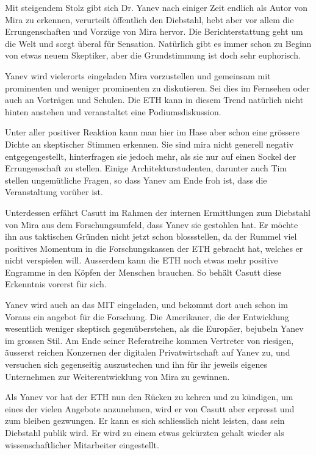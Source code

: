 \documentclass[11pt,a4paper,ngerman]{scrreprt}
\begin{document}
Mit steigendem Stolz gibt sich Dr. Yanev nach einiger Zeit endlich als Autor von
Mira zu erkennen, verurteilt öffentlich den Diebstahl, hebt aber vor allem die
Errungenschaften und Vorzüge von Mira hervor. Die Berichterstattung geht um die
Welt und sorgt überal für Sensation. Natürlich gibt es immer schon zu Beginn von
etwas neuem Skeptiker, aber die Grundstimmung ist doch sehr euphorisch.

Yanev wird vielerorts eingeladen Mira vorzustellen und gemeinsam mit prominenten
und weniger prominenten zu diskutieren. Sei dies im Fernsehen oder auch an
Vorträgen und Schulen. Die ETH kann in diesem Trend natürlich nicht hinten
anstehen und veranstaltet eine Podiumsdiskussion.

Unter aller positiver Reaktion kann man hier im Hase aber schon eine grössere
Dichte an skeptischer Stimmen erkennen. Sie sind mira nicht generell negativ
entgegengestellt, hinterfragen sie jedoch mehr, als sie nur auf einen Sockel der
Errungenschaft zu stellen. Einige Architekturstudenten, darunter auch Tim
stellen ungemütliche Fragen, so dass Yanev am Ende froh ist, dass die
Veranstaltung vorüber ist.

Unterdessen erfährt Casutt im Rahmen der internen Ermittlungen zum Diebstahl
von Mira aus dem Forschungsumfeld, dass Yanev sie gestohlen hat. Er möchte ihn
aus taktischen Gründen nicht jetzt schon blossstellen, da der Rummel viel
positives Momentum in die Forschungskassen der ETH gebracht hat, welches er
nicht verspielen will. Ausserdem kann die ETH noch etwas mehr positive Engramme
in den Köpfen der Menschen brauchen. So behält Casutt diese Erkenntnis vorerst
für sich.

Yanev wird auch an das MIT eingeladen, und bekommt dort auch schon im Voraus ein
angebot für die Forschung. Die Amerikaner, die der Entwicklung wesentlich
weniger skeptisch gegenüberstehen, als die Europäer, bejubeln Yanev im grossen
Stil. Am Ende seiner Referatreihe kommen Vertreter von riesigen, äusserst
reichen Konzernen der digitalen Privatwirtschaft auf Yanev zu, und versuchen
sich gegenseitig auszustechen und ihn für ihr jeweils eigenes Unternehmen zur
Weiterentwicklung von Mira zu gewinnen.

Als Yanev vor hat der ETH nun den Rücken zu kehren und zu kündigen, um eines der
vielen Angebote anzunehmen, wird er von Casutt aber erpresst und zum bleiben
gezwungen. Er kann es sich schliesslich nicht leisten, dass sein Diebstahl
publik wird. Er wird zu einem etwas gekürzten gehalt wieder als
wissenschaftlicher Mitarbeiter eingestellt.
\end{document}
